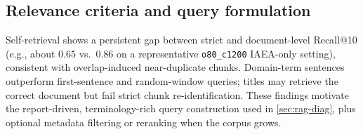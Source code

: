 \subsection{Relevance criteria and query formulation}
Self-retrieval shows a persistent gap between strict and document-level Recall@10 (e.g., about $0.65$ vs.~$0.86$ on a representative \texttt{o80\_c1200} IAEA-only setting), consistent with overlap-induced near-duplicate chunks.
Domain-term sentences outperform first-sentence and random-window queries; titles may retrieve the correct document but fail strict chunk re-identification.
These findings motivate the report-driven, terminology-rich query construction used in \cref{sec:rag-diag}, plus optional metadata filtering or reranking when the corpus grows.
